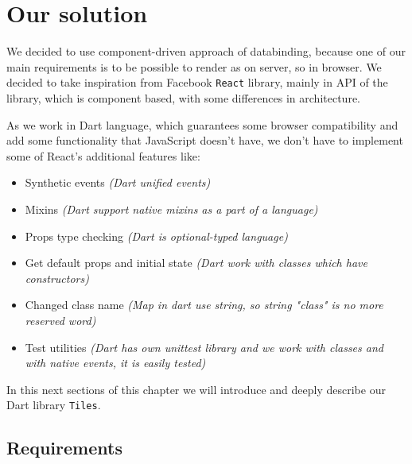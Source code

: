 \documentclass[oneside, 12pt]{book}
\begin{document}

\chapter{Our solution}\label{chap:oursolution}

We decided to use component-driven approach of databinding, 
because one of our main requirements is to be possible to render as on server, so in browser.
We decided to take inspiration from Facebook \texttt{React} library, mainly in API of the library, which is component based, 
with some differences in architecture.

As we work in Dart language, which guarantees some browser compatibility and add some functionality that JavaScript doesn't have,
we don't have to implement some of React's additional features like:
\begin{itemize}
  \item Synthetic events \textit{(Dart unified events)}
  \item Mixins \textit{(Dart support native mixins as a part of a language)}
  \item Props type checking \textit{(Dart is optional-typed language)}
  \item Get default props and initial state \textit{(Dart work with classes which have constructors)}
  \item Changed class name \textit{(Map in dart use string, so string "class" is no more reserved word)}
  \item Test utilities \textit{(Dart has own unittest library and we work with classes and with native events, it is easily tested)}
\end{itemize}

In this next sections of this chapter we will introduce and deeply describe our Dart library \texttt{Tiles}.

\section{Requirements}\label{subsec:our-architecture-requirements}
\end{document}
